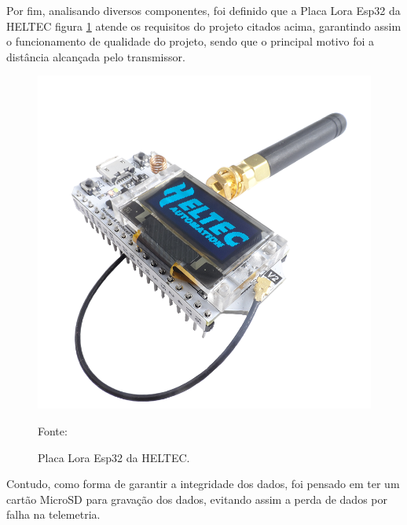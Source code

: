 \par Por fim, analisando diversos componentes, foi definido que a Placa Lora Esp32 da HELTEC figura \ref{fig:Placa Esp32 Lora } atende os requisitos do projeto citados acima, garantindo assim o funcionamento de qualidade do projeto, sendo que o principal motivo foi a distância alcançada pelo transmissor.

\begin{figure}[!htb]
\centering
\includegraphics[scale=0.3]{figuras/SAM_0748_800X800.png}  
\caption{Placa Lora Esp32 da HELTEC.}
{\footnotesize Fonte:\cite{datasheet_ESP32}}
\label{fig:Placa Esp32 Lora }
\end{figure}
\par Contudo, como forma de garantir a integridade dos dados, foi pensado em ter um cartão MicroSD para gravação dos dados, evitando assim a perda de dados por falha na telemetria. 



